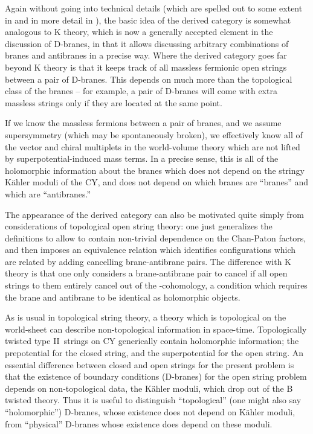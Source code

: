 \documentclass[a4paper,12pt]{amsart}
\numberwithin{equation}{section}
\theoremstyle{plain}
\theoremstyle{definition}
\def\cal{\mathcal}
\def \II {II}
\def\CN{{\cal N}}
\begin{document}
Again without going into technical details (which are
spelled out to some extent in \cite{DCS} and in more detail in
\cite{AspLaw,Diac}), the basic idea of the derived category is
somewhat analogous to K theory, which is now a generally accepted
element in the discussion of D-branes, in that it allows discussing
arbitrary combinations of branes and antibranes in a precise way.
Where the derived category goes far beyond K theory is that it keeps
track of all massless fermionic open strings between a pair of
D-branes.  This depends on much more than the topological class of the
branes -- for example, a pair of D\coordHE{}-branes will come with extra
massless strings only if they are located at the same point.

If we know the massless fermions between a pair of branes, and we
assume \myHighlight{$\CN=1$}\coordHE{} supersymmetry (which may be spontaneously broken), we
effectively know all of the vector and chiral multiplets in the
world-volume theory which are not lifted by superpotential-induced
mass terms.  In a precise sense, this is all of the holomorphic
information about the branes which does not depend on the stringy
K\"ahler moduli of the CY, and does not depend on which branes are
``branes'' and which are ``antibranes.''  

The appearance of the derived category can also be motivated quite
simply from considerations of topological open string theory: one just
generalizes the definitions to allow \coordHE{} to contain non-trivial
dependence on the Chan-Paton factors, and then imposes an equivalence
relation which identifies configurations which are related by adding
cancelling brane-antibrane pairs.  The difference with K theory is
that one only considers a brane-antibrane pair to cancel if all open
strings to them entirely cancel out of the \coordHE{}-cohomology, a condition
which requires the brane and antibrane to be identical as holomorphic
objects.  

As is usual in topological string theory, a theory which is
topological on the world-sheet can describe non-topological
information in space-time.  Topologically twisted type \II\ strings on
CY generically contain holomorphic information; the \myHighlight{$\CN=2$}\coordHE{}
prepotential for the closed string, and the \myHighlight{$\CN=1$}\coordHE{} superpotential for
the open string.  An essential difference between closed and open
strings for the present problem is that the existence of boundary
conditions (D-branes) for the open string problem depends on
non-topological data, the K\"ahler moduli, which drop out of the B
twisted theory.  Thus it is useful to distinguish ``topological''
(one might also say ``holomorphic'') D-branes, whose existence does not
depend on K\"ahler moduli, from ``physical'' D-branes whose existence
does depend on these moduli.
\end{document}
